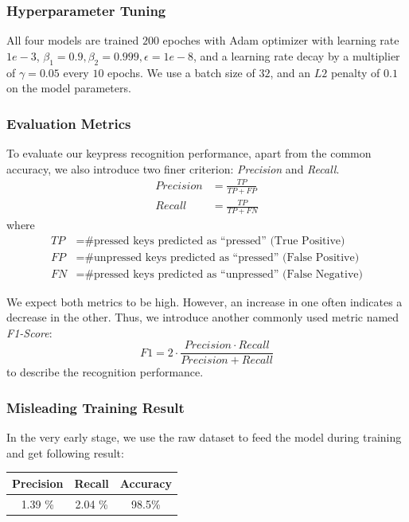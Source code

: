 \documentclass[10pt,twocolumn,letterpaper]{article}
\begin{document}
\subsubsection{Hyperparameter Tuning}

All four models are trained \(200\) epoches with Adam optimizer with learning rate \(1e-3\), \(\beta_1 = 0.9, \beta_2 = 0.999, \epsilon = 1e-8\), and a learning rate decay by a multiplier of \(\gamma=0.05\) every $10$ epochs. 
We use a batch size of \(32\), and an \(L2\) penalty of \(0.1\) on the model parameters. 


\subsubsection{Evaluation Metrics}

To evaluate our keypress recognition performance, apart from the common accuracy, we also introduce two finer criterion: \textit{Precision} and \textit{Recall}.
\begin{align*}
   Precision &= \frac{TP}{TP+FP}\\
   Recall &= \frac{TP}{TP+FN}
\end{align*}
where
\begin{align*}
   TP &= \text{\# pressed keys predicted as ``pressed'' (True Positive)}\\
   FP &= \text{\# unpressed keys predicted as ``pressed'' (False Positive)}\\
   FN &= \text{\# pressed keys predicted as ``unpressed'' (False Negative)}
\end{align*}

We expect both metrics to be high. However, an increase in one often indicates a decrease in the other.
Thus, we introduce another commonly used metric named \textit{F1-Score}:
$$F1 = 2\cdot\dfrac{Precision\cdot Recall}{Precision + Recall}$$
to describe the recognition performance.

\subsubsection{Misleading Training Result}

In the very early stage, we use the raw dataset to feed the model during training and get following result:

\begin{minipage}{0.9\linewidth}
   \centering
\begin{tabular}{ccc}
   \toprule
   Precision &Recall&Accuracy\\
   \midrule
   1.39 \%& 2.04 \%&98.5\%\\
   \bottomrule
   \end{tabular}
    \label{tab:prevdataset}

\end{minipage}
\end{document}
